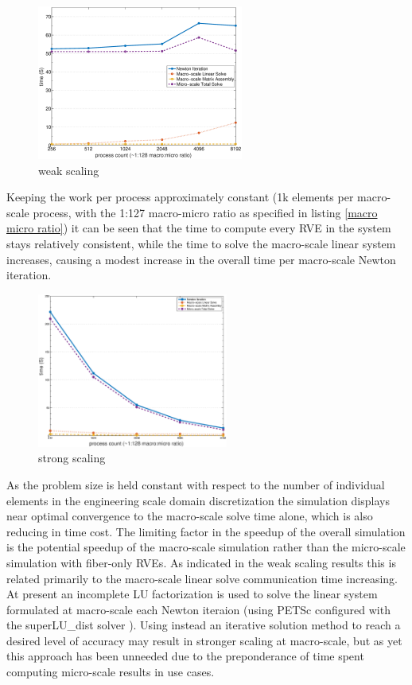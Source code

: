 \documentclass[11pt]{article}
\begin{document}
%
\begin{figure}
  \begin{center}
    \includegraphics[height=2in]{ws_phil.eps}
  \end{center}
  \caption{\small weak scaling}
  \label{weak scaling}
\end{figure}
%
Keeping the work per process approximately constant (1k elements per macro-scale process, with the 1:127 macro-micro ratio as specified in listing \ref{macro micro ratio}) it can be seen that the time to compute every RVE in the system stays relatively consistent, while the time to solve the macro-scale linear system increases, causing a modest increase in the overall time per macro-scale Newton iteration.

%
\begin{figure}
  \begin{center}
    \includegraphics[height=2in]{ss_phil.eps}
  \end{center}
  \caption{\small strong scaling}
  \label{strong scaling}
\end{figure}
%
As the problem size is held constant with respect to the number of individual elements in the engineering scale domain discretization the simulation displays near optimal convergence to the macro-scale solve time alone, which is also reducing in time cost. The limiting factor in the speedup of the overall simulation is the potential speedup of the macro-scale simulation rather than the micro-scale simulation with fiber-only RVEs. As indicated in the weak scaling results this is related primarily to the macro-scale linear solve communication time increasing. At present an incomplete LU factorization is used to solve the linear system formulated at macro-scale each Newton iteraion (using PETSc configured with the superLU\_dist solver \cite{li05superlu} \cite{lishao10superluilu} \cite{lidemmel03superludist} ). Using instead an iterative solution method to reach a desired level of accuracy may result in stronger scaling at macro-scale, but as yet this approach has been unneeded due to the preponderance of time spent computing micro-scale results in use cases.
\end{document}
